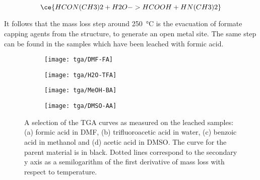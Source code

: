 \begin{equation}\label{def:eqn:dmf-hydrolysis}
    \ce{HCON(CH3)2 + H2O -> HCOOH + HN(CH3)2}
\end{equation}

It follows that the mass loss step around \SI{250}{\degreeCelsius}
is the evacuation of formate capping agents from the 
structure, to generate an open metal site. The same step
can be found in the samples which have been leached with
formic acid.

\begin{figure}[htbp]
    \centering

    \begin{subfigure}{0.45\linewidth}
        \texttt{[image: tga/DMF-FA]}%
		\caption{}%
        \label{def:fgr:tga-dmf-fa}
    \end{subfigure}
    \begin{subfigure}{0.45\linewidth}
        \texttt{[image: tga/H2O-TFA]}%
		\caption{}%
        \label{def:fgr:tga-h2o-tfa}
    \end{subfigure}

    
    \begin{subfigure}{0.45\linewidth}
        \texttt{[image: tga/MeOH-BA]}%
		\caption{}%
        \label{def:fgr:tga-meoh-ba}
    \end{subfigure}
    \begin{subfigure}{0.45\linewidth}
        \texttt{[image: tga/DMSO-AA]}%
		\caption{}%
        \label{def:fgr:tga-dmso-aa}
    \end{subfigure}

    \caption{A selection of the TGA curves as measured on the
    leached samples: (a) formic acid in DMF, (b) trifluoroacetic
    acid in water, (c) benzoic acid in methanol and (d) acetic acid
    in DMSO. The curve for the parent material is in black. 
    Dotted lines correspond to the secondary y axis as a 
    semilogarithm of the first derivative of mass loss with 
    respect to temperature.}%
    \label{def:fgr:tga-dataset}
\end{figure}

